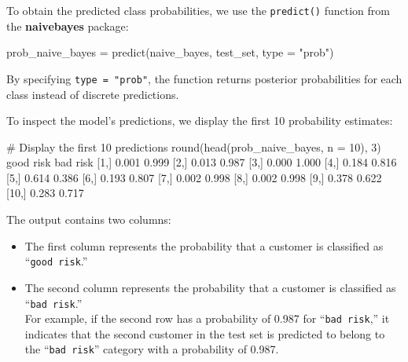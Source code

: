 \documentclass[
  11pt,
]{book}
\makeatletter
\newenvironment{Shaded}{}{}
\newcommand{\AttributeTok}[1]{#1}
\newcommand{\CommentTok}[1]{\textcolor[rgb]{0.36,0.36,0.36}{#1}}
\newcommand{\DecValTok}[1]{#1}
\newcommand{\FloatTok}[1]{#1}
\newcommand{\FunctionTok}[1]{#1}
\newcommand{\NormalTok}[1]{#1}
\newcommand{\OtherTok}[1]{\textcolor[rgb]{0.39,0.39,0.39}{#1}}
\newcommand{\StringTok}[1]{\textcolor[rgb]{0.39,0.39,0.39}{#1}}
\providecommand{\tightlist}{%
  \setlength{\itemsep}{0pt}\setlength{\parskip}{0pt}}
\newenvironment{kframe}{%
\medskip{}
\setlength{\fboxsep}{.8em}
 \def\at@end@of@kframe{}%
 \ifinner\ifhmode%
  \def\at@end@of@kframe{\end{minipage}}%
  \begin{minipage}{\columnwidth}%
 \fi\fi%
 \def\FrameCommand##1{\hskip\@totalleftmargin \hskip-\fboxsep
 \colorbox{shadecolor}{##1}\hskip-\fboxsep
     \hskip-\linewidth \hskip-\@totalleftmargin \hskip\columnwidth}%
 \MakeFramed {\advance\hsize-\width
   \@totalleftmargin\z@ \linewidth\hsize
   \@setminipage}}%
 {\par\unskip\endMakeFramed%
 \at@end@of@kframe}
\renewenvironment{Shaded}{\begin{kframe}}{\end{kframe}}
\theoremstyle{definition}
\theoremstyle{definition}
\theoremstyle{definition}
\theoremstyle{definition}
\theoremstyle{remark}
\makeatother
\begin{document}
To obtain the predicted class probabilities, we use the \texttt{predict()} function from the \textbf{naivebayes} package:

\begin{Shaded}
\begin{Highlighting}[]
\NormalTok{prob\_naive\_bayes }\OtherTok{=} \FunctionTok{predict}\NormalTok{(naive\_bayes, test\_set, }\AttributeTok{type =} \StringTok{"prob"}\NormalTok{)}
\end{Highlighting}
\end{Shaded}

By specifying \texttt{type\ =\ "prob"}, the function returns posterior probabilities for each class instead of discrete predictions.

To inspect the model's predictions, we display the first 10 probability estimates:

\begin{Shaded}
\begin{Highlighting}[]
\CommentTok{\# Display the first 10 predictions}
\FunctionTok{round}\NormalTok{(}\FunctionTok{head}\NormalTok{(prob\_naive\_bayes, }\AttributeTok{n =} \DecValTok{10}\NormalTok{), }\DecValTok{3}\NormalTok{)}
\NormalTok{         good risk bad risk}
\NormalTok{    [}\DecValTok{1}\NormalTok{,]     }\FloatTok{0.001}    \FloatTok{0.999}
\NormalTok{    [}\DecValTok{2}\NormalTok{,]     }\FloatTok{0.013}    \FloatTok{0.987}
\NormalTok{    [}\DecValTok{3}\NormalTok{,]     }\FloatTok{0.000}    \FloatTok{1.000}
\NormalTok{    [}\DecValTok{4}\NormalTok{,]     }\FloatTok{0.184}    \FloatTok{0.816}
\NormalTok{    [}\DecValTok{5}\NormalTok{,]     }\FloatTok{0.614}    \FloatTok{0.386}
\NormalTok{    [}\DecValTok{6}\NormalTok{,]     }\FloatTok{0.193}    \FloatTok{0.807}
\NormalTok{    [}\DecValTok{7}\NormalTok{,]     }\FloatTok{0.002}    \FloatTok{0.998}
\NormalTok{    [}\DecValTok{8}\NormalTok{,]     }\FloatTok{0.002}    \FloatTok{0.998}
\NormalTok{    [}\DecValTok{9}\NormalTok{,]     }\FloatTok{0.378}    \FloatTok{0.622}
\NormalTok{   [}\DecValTok{10}\NormalTok{,]     }\FloatTok{0.283}    \FloatTok{0.717}
\end{Highlighting}
\end{Shaded}

The output contains two columns:

\begin{itemize}
\tightlist
\item
  The first column represents the probability that a customer is classified as ``\texttt{good\ risk}.''
\item
  The second column represents the probability that a customer is classified as ``\texttt{bad\ risk}.''\\
  For example, if the second row has a probability of 0.987 for ``\texttt{bad\ risk},'' it indicates that the second customer in the test set is predicted to belong to the ``\texttt{bad\ risk}'' category with a probability of 0.987.
\end{itemize}
\end{document}
